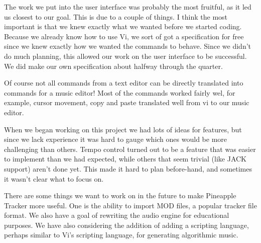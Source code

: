 \documentclass[12pt,letterpaper]{article}
\begin{document}
\par

\par
The work we put into the user interface was probably the most fruitful, as it led us closest to our goal. This is due to a couple of things. I think the most important is that we knew exactly what we wanted before we started coding. Because we already know how to use Vi, we sort of got a specification for free since we knew exactly how we wanted the commands to behave. Since we didn't do much planning, this allowed our work on the user interface to be successful. We did make our own specification about halfway through the quarter.

\par
Of course not all commands from a text editor can be directly translated into commands for a music editor! Most of the commands worked fairly wel, for example, cursor movement, copy and paste translated well from vi to our music editor.

\par
When we began working on this project we had lots of ideas for features, but since we lack experience it was hard to gauge which ones would be more challenging than others. Tempo control turned out to be a feature that was easier to implement than we had expected, while others that seem trivial (like JACK support) aren't done yet. This made it hard to plan before-hand, and sometimes it wasn't clear what to focus on.

\par
There are some things we want to work on in the future to make Pineapple Tracker more useful. One is the ability to import MOD files, a popular tracker file format. We also have a goal of rewriting the audio engine for educational purposes. We have also considering the addition of adding a scripting language, perhaps similar to Vi's scripting language, for generating algorithmic music.
\end{document}

